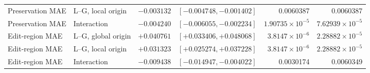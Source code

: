 \begin{table}[!t]
\begin{tabular}{@{}llrrrr@{}}
Preservation MAE & L--G, local origin & $-0.003132$ & $[-0.004748,-0.001402]$ & 0.0060387 & 0.0060387\\
Preservation MAE & Interaction & $-0.004240$ & $[-0.006055,-0.002234]$ & $1.90735\times10^{-5}$ & $7.62939\times10^{-5}$\\
Edit-region MAE & L--G, global origin & $+0.040761$ & $[+0.033406,+0.048068]$ & $3.8147\times10^{-6}$ & $2.28882\times10^{-5}$\\
Edit-region MAE & L--G, local origin & $+0.031323$ & $[+0.025274,+0.037228]$ & $3.8147\times10^{-6}$ & $2.28882\times10^{-5}$\\
Edit-region MAE & Interaction & $-0.009438$ & $[-0.014947,-0.004022]$ & 0.0030174 & 0.0060349\\
\bottomrule
\end{tabular}
\end{table}

